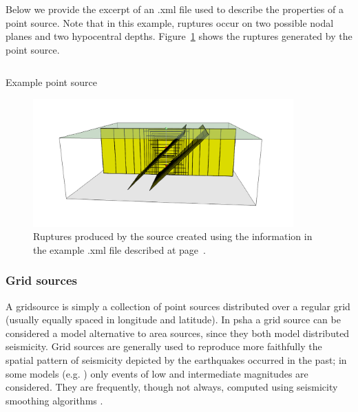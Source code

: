 Below we provide the excerpt of an .xml file used to describe the properties of a point source. Note that in this example, ruptures occur on two possible nodal planes and two hypocentral depths. Figure~\ref{fig:point_source_ruptures} shows the ruptures generated by the point source.

\begin{listing}[htbp]
  \inputminted[firstline=1,firstnumber=1,fontsize=\footnotesize,frame=single,linenos,bgcolor=lightgray]{xml}{oqum/hazard/verbatim/input_point_source.xml}
  \caption{Example point source}
  \label{page:point_source_nrml}
\end{listing}





\begin{figure}[!ht]
\centering
\includegraphics[width=10cm]{figures/hazard/pointsrc_2strike_2hypodep.pdf}
\caption{Ruptures produced by the source created using the information 
in the example .xml file described at page~\pageref{page:point_source_nrml}.}
\label{fig:point_source_ruptures}
\end{figure}

\subsubsection{Grid sources}
\label{subsubsec:grid_sources}

A \gls{gridsource} is simply a collection of point sources distributed over a regular grid (usually equally spaced in longitude and latitude). In \gls{psha} a grid source can be considered a model alternative to area
sources, since they both model distributed seismicity. Grid sources are generally used to reproduce more faithfully the spatial pattern of seismicity depicted by the earthquakes occurred in the past; in
some models (e.g. \citet{petersen2008}) only events of low and intermediate magnitudes are considered. They are frequently, though not always, computed using seismicity smoothing algorithms \citep[][amongst many others]{frankel1995,woo1996}.

